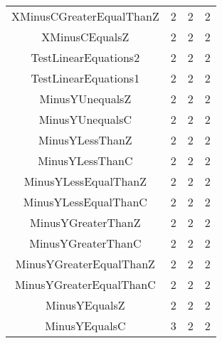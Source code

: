 \begin{table}
\begin{center}
\begin{tabular}{c|c|c|c}
XMinusCGreaterEqualThanZ                               &           2       &           2       &           2             \\
XMinusCEqualsZ                                         &           2       &           2       &           2             \\
TestLinearEquations2                                   &           2       &           2       &           2             \\
TestLinearEquations1                                   &           2       &           2       &           2             \\
MinusYUnequalsZ                                        &           2       &           2       &           2             \\
MinusYUnequalsC                                        &           2       &           2       &           2             \\
MinusYLessThanZ                                        &           2       &           2       &           2             \\
MinusYLessThanC                                        &           2       &           2       &           2             \\
MinusYLessEqualThanZ                                   &           2       &           2       &           2             \\
MinusYLessEqualThanC                                   &           2       &           2       &           2             \\
MinusYGreaterThanZ                                     &           2       &           2       &           2             \\
MinusYGreaterThanC                                     &           2       &           2       &           2             \\
MinusYGreaterEqualThanZ                                &           2       &           2       &           2             \\
MinusYGreaterEqualThanC                                &           2       &           2       &           2             \\
MinusYEqualsZ                                          &           2       &           2       &           2             \\
MinusYEqualsC                                          &           3       &           2       &           2             \\



\hline
\end{tabular}
\end{center}
\label{table-failed}
\end{table}
